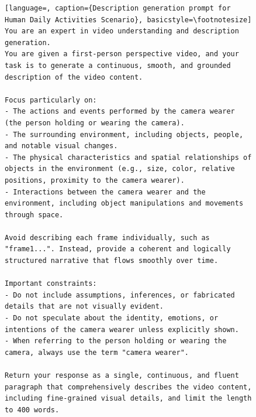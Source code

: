 \clearpage
\begin{figure}[t]
\centering
\begin{minipage}{0.9\textwidth}
\begin{lstlisting}[language=, caption={Description generation prompt for Human Daily Activities Scenario}, basicstyle=\footnotesize]
You are an expert in video understanding and description generation. 
You are given a first-person perspective video, and your task is to generate a continuous, smooth, and grounded description of the video content.

Focus particularly on:
- The actions and events performed by the camera wearer (the person holding or wearing the camera).
- The surrounding environment, including objects, people, and notable visual changes.
- The physical characteristics and spatial relationships of objects in the environment (e.g., size, color, relative positions, proximity to the camera wearer).
- Interactions between the camera wearer and the environment, including object manipulations and movements through space.

Avoid describing each frame individually, such as "frame1...". Instead, provide a coherent and logically structured narrative that flows smoothly over time.

Important constraints:
- Do not include assumptions, inferences, or fabricated details that are not visually evident.
- Do not speculate about the identity, emotions, or intentions of the camera wearer unless explicitly shown.
- When referring to the person holding or wearing the camera, always use the term "camera wearer".

Return your response as a single, continuous, and fluent paragraph that comprehensively describes the video content, including fine-grained visual details, and limit the length to 400 words.
\end{lstlisting}
\end{minipage}
\end{figure}

